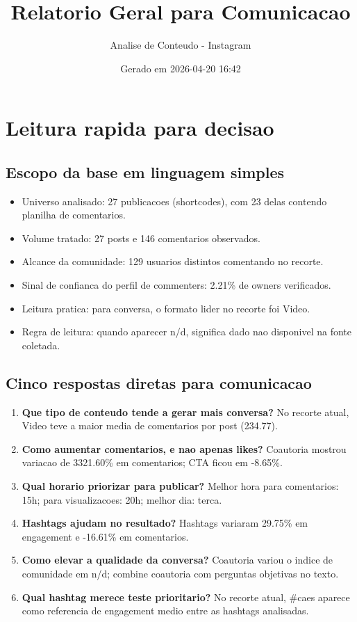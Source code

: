 \documentclass[12pt,a4paper]{article}
\title{Relatorio Geral para Comunicacao}
\author{Analise de Conteudo - Instagram}
\date{Gerado em 2026-04-20 16:42}
\begin{document}
\maketitle
\tableofcontents
\newpage
\section{Leitura rapida para decisao}
\subsection{Escopo da base em linguagem simples}
\begin{itemize}
\item Universo analisado: 27 publicacoes (shortcodes), com 23 delas contendo planilha de comentarios.
\item Volume tratado: 27 posts e 146 comentarios observados.
\item Alcance da comunidade: 129 usuarios distintos comentando no recorte.
\item Sinal de confianca do perfil de commenters: 2.21\% de owners verificados.
\item Leitura pratica: para conversa, o formato lider no recorte foi Video.
\item Regra de leitura: quando aparecer n/d, significa dado nao disponivel na fonte coletada.
\end{itemize}
\subsection{Cinco respostas diretas para comunicacao}
\begin{enumerate}
\item \textbf{Que tipo de conteudo tende a gerar mais conversa?} No recorte atual, Video teve a maior media de comentarios por post (234.77).
\item \textbf{Como aumentar comentarios, e nao apenas likes?} Coautoria mostrou variacao de 3321.60\% em comentarios; CTA ficou em -8.65\%.
\item \textbf{Qual horario priorizar para publicar?} Melhor hora para comentarios: 15h; para visualizacoes: 20h; melhor dia: terca.
\item \textbf{Hashtags ajudam no resultado?} Hashtags variaram 29.75\% em engagement e -16.61\% em comentarios.
\item \textbf{Como elevar a qualidade da conversa?} Coautoria variou o indice de comunidade em n/d; combine coautoria com perguntas objetivas no texto.
\item \textbf{Qual hashtag merece teste prioritario?} No recorte atual, \#caes aparece como referencia de engagement medio entre as hashtags analisadas.
\end{enumerate}
\end{document}
